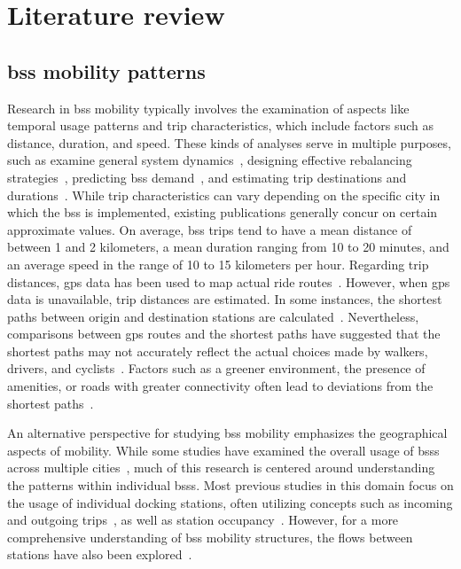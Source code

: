 \section{Literature review}

\subsection[BSS mobility patterns]{\ac{bss} mobility patterns}

Research in \ac{bss} mobility typically involves the examination of aspects like temporal usage patterns and trip characteristics, which include factors such as distance, duration, and speed. These kinds of analyses serve in multiple purposes, such as examine general system dynamics~\cite{Jensen2010, Ciancia2015, Zaltz2013}, designing effective rebalancing strategies~\cite{Chiariotti2018}, predicting \ac{bss} demand~\cite{Borgnat2011}, and estimating trip destinations and durations~\cite{Zhang2016Bicycle}. While trip characteristics can vary depending on the specific city in which the \ac{bss} is implemented, existing publications generally concur on certain approximate values. On average, \ac{bss} trips tend to have a mean distance of between 1 and 2 kilometers, a mean duration ranging from 10 to 20 minutes, and an average speed in the range of 10 to 15 kilometers per hour. Regarding trip distances, \ac{gps} data has been used to map actual ride routes~\cite{Talavera_Garcia2021}. However, when \ac{gps} data is unavailable, trip distances are estimated. In some instances, the shortest paths between origin and destination stations are calculated~\cite{Oliveira2016}. Nevertheless, comparisons between \ac{gps} routes and the shortest paths have suggested that the shortest paths may not accurately reflect the actual choices made by walkers, drivers, and cyclists~\cite{Zhu2015, Lu2018, Klein2023}. Factors such as a greener environment, the presence of amenities, or roads with greater connectivity often lead to deviations from the shortest paths~\cite{Klein2023}.

An alternative perspective for studying \ac{bss} mobility emphasizes the geographical aspects of mobility. While some studies have examined the overall usage of \acp{bss} across multiple cities~\cite{Zhao2014, DuranRodas2019, Sarkar2015}, much of this research is centered around understanding the patterns within individual \acp{bss}. Most previous studies in this domain focus on the usage of individual docking stations, often utilizing concepts such as incoming and outgoing trips~\cite{Moncayo2016, FaghihImani2014, Wang2016, FaghihImani2017Empirical, DuranRodas2019, Oliveira2016}, as well as station occupancy~\cite{OBrien2014, Sarkar2015}. However, for a more comprehensive understanding of \ac{bss} mobility structures, the flows between stations have also been explored~\cite{Corcoran2014, Yang2019, Kon2021}.

